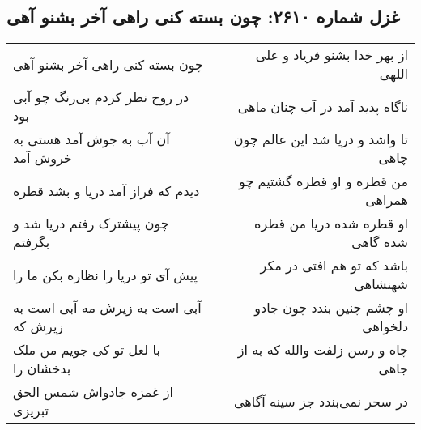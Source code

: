 \begin{center}
\section*{غزل شماره ۲۶۱۰: چون بسته کنی راهی آخر بشنو آهی}
\label{sec:2610}
\begin{longtable}{l p{0.5cm} r}
چون بسته کنی راهی آخر بشنو آهی
&&
از بهر خدا بشنو فریاد و علی اللهی
\\
در روح نظر کردم بی‌رنگ چو آبی بود
&&
ناگاه پدید آمد در آب چنان ماهی
\\
آن آب به جوش آمد هستی به خروش آمد
&&
تا واشد و دریا شد این عالم چون چاهی
\\
دیدم که فراز آمد دریا و بشد قطره
&&
من قطره و او قطره گشتیم چو همراهی
\\
چون پیشترک رفتم دریا شد و بگرفتم
&&
او قطره شده دریا من قطره شده گاهی
\\
پیش آی تو دریا را نظاره بکن ما را
&&
باشد که تو هم افتی در مکر شهنشاهی
\\
آبی است به زیرش مه آبی است به زیرش که
&&
او چشم چنین بندد چون جادو دلخواهی
\\
با لعل تو کی جویم من ملک بدخشان را
&&
چاه و رسن زلفت والله که به از جاهی
\\
از غمزه جادواش شمس الحق تبریزی
&&
در سحر نمی‌بندد جز سینه آگاهی
\\
\end{longtable}
\end{center}
